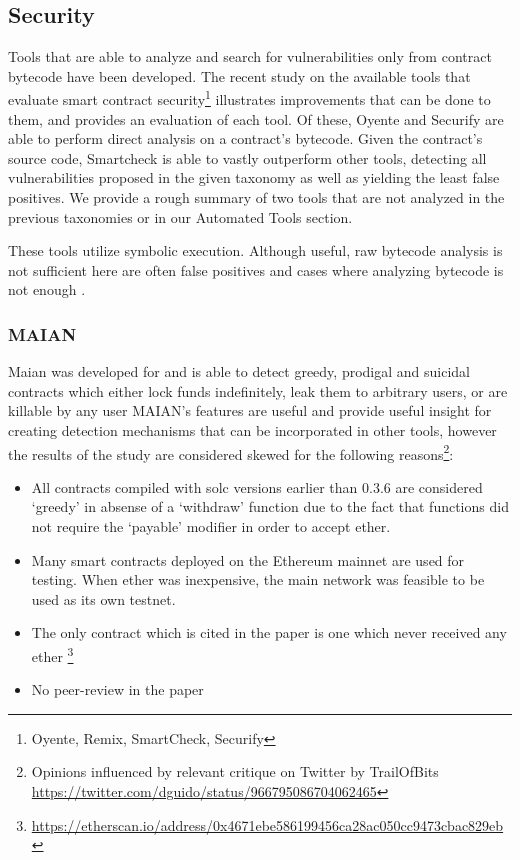 \subsection{Security}
Tools that are able to analyze and search for vulnerabilities only from contract bytecode have been developed\cite{Luu:2016:MSC:2976749.2978309, greedyprodigal, mythril}. The recent study\cite{tools} on the available tools that evaluate smart contract security\footnote{Oyente, Remix, SmartCheck, Securify} illustrates improvements that can be done to them, and provides an evaluation of each tool. Of these, Oyente and Securify are able to perform direct analysis on a contract's bytecode. Given the contract's source code, Smartcheck is able to vastly outperform other tools, detecting all vulnerabilities proposed in the given taxonomy as well as yielding the least false positives. We provide a rough summary of two tools that are not analyzed in the previous taxonomies or in our Automated Tools section.

These tools utilize symbolic execution. Although useful, raw bytecode analysis is not sufficient here are often false positives and cases where analyzing bytecode is not enough \cite{zeus}. 

\subsubsection{MAIAN}
Maian \cite{maian} was developed for \cite{greedyprodigal} and is able to detect greedy, prodigal and suicidal contracts which either lock funds indefinitely, leak them to arbitrary users, or are killable by any user %
MAIAN's features are useful and provide useful insight for creating detection mechanisms that can be incorporated in other tools, however the results of the study are considered skewed for the following reasons\footnote{Opinions influenced by relevant critique on Twitter by TrailOfBits \url{https://twitter.com/dguido/status/966795086704062465}}:
\begin{itemize}
    \item All contracts compiled with solc versions earlier than 0.3.6 are considered `greedy' in absense of a `withdraw' function due to the fact that functions did not require the `payable' modifier in order to accept ether. 
    \item Many smart contracts deployed on the Ethereum mainnet are used for testing. When ether was inexpensive, the main network was feasible to be used as its own testnet.
    \item The only contract which is cited in the paper is one which never  received any ether \footnote{\url{https://etherscan.io/address/0x4671ebe586199456ca28ac050cc9473cbac829eb}}
    \item No peer-review in the paper
\end{itemize}

